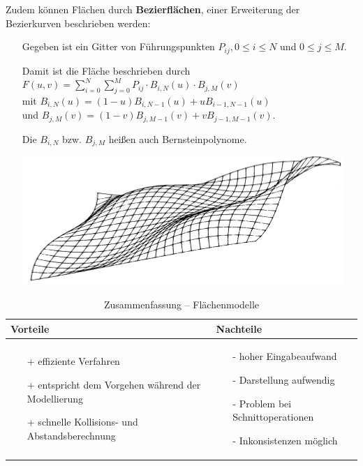 Zudem können Flächen durch \textbf{Bezierflächen}, einer Erweiterung der Bezierkurven beschrieben werden:
\begin{itemize}
\item[] Gegeben ist ein Gitter von Führungspunkten $P_{ij}, 0 \leq i \leq N$ und $0 \leq j \leq M$.
\item[] Damit ist die Fläche beschrieben durch $F(u,v) = \sum_{i=0}^N \sum_{j=0}^M P_{ij} \cdot B_{i,N}(u) \cdot B_{j,M}(v)$\\
 mit $B_{i,N}(u) = (1-u)B_{i,N-1}(u)+uB_{i-1,N-1}(u)$\\
 und $B_{j,M}(v) = (1-v)B_{j,M-1}(v)+vB_{j-1,M-1}(v)$.
\item[] Die $B_{i,N}$ bzw. $B_{j,M}$ heißen auch Bernsteinpolynome.
\begin{center}
\includegraphics[width=.4\linewidth]{figures/ch02_bezier.png}
\end{center}
\end{itemize}
\begin{table}[hbt]
\centering
\begin{tabular}{|p{6.5cm}|p{6.5cm}|}
\hline
Vorteile & Nachteile\\
\hline
\vspace{-5mm}
\begin{itemize}
\setlength\itemsep{0em}
\item[+] effiziente Verfahren 
\item[+] entspricht dem Vorgehen während der Modellierung
\item[+] schnelle Kollisions- und Abstandsberechnung
\end{itemize}
 &
 \vspace{-5mm}
\begin{itemize}
\setlength\itemsep{0em}
\item[-] hoher Eingabeaufwand
\item[-] Darstellung aufwendig
\item[-] Problem bei Schnittoperationen
\item[-] Inkonsistenzen möglich
\end{itemize}\\
\hline
\end{tabular}
\caption{Zusammenfassung -- Flächenmodelle}
\label{tab:Flaechenmod}
\end{table}
\noindent

